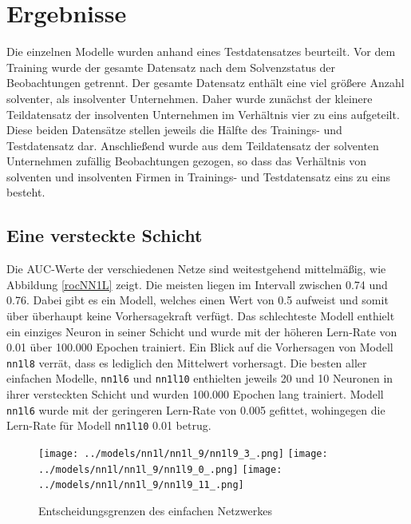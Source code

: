 \documentclass{article}
\begin{document}
\section{Ergebnisse}

Die einzelnen Modelle wurden anhand eines Testdatensatzes beurteilt. Vor dem Training wurde der gesamte Datensatz nach dem Solvenzstatus der Beobachtungen getrennt. Der gesamte Datensatz enth{\"a}lt eine viel gr{\"o}{\ss}ere Anzahl solventer, als insolventer Unternehmen. Daher wurde zun{\"a}chst der kleinere Teildatensatz der insolventen Unternehmen im Verh{\"a}ltnis vier zu eins aufgeteilt. Diese beiden Datens{\"a}tze stellen jeweils die H{\"a}lfte des Trainings- und Testdatensatz dar. Anschlie{\ss}end wurde aus dem Teildatensatz der solventen Unternehmen zuf{\"a}llig Beobachtungen gezogen, so dass das Verh{\"a}ltnis von solventen und insolventen Firmen in Trainings- und Testdatensatz eins zu eins besteht.

\subsection{Eine versteckte Schicht}

Die AUC-Werte der verschiedenen Netze sind weitestgehend mittelm{\"a}{\ss}ig, wie Abbildung \ref{rocNN1L} zeigt. Die meisten liegen im Intervall zwischen 0.74 und 0.76. Dabei gibt es ein Modell, welches einen Wert von 0.5 aufweist und somit {\"u}ber {\"u}berhaupt keine Vorhersagekraft verf{\"u}gt. Das schlechteste Modell enthielt ein einziges Neuron in seiner Schicht und wurde mit der h{\"o}heren Lern-Rate von 0.01 {\"u}ber 100.000 Epochen trainiert. Ein Blick auf die Vorhersagen von Modell \texttt{nn1l8} verr{\"a}t, dass es lediglich den Mittelwert vorhersagt. Die besten aller einfachen Modelle, \texttt{nn1l6} und \texttt{nn1l10} enthielten jeweils 20 und 10 Neuronen in ihrer versteckten Schicht und wurden 100.000 Epochen lang trainiert. Modell \texttt{nn1l6} wurde mit der geringeren Lern-Rate von 0.005 gefittet, wohingegen die Lern-Rate f{\"u}r Modell \texttt{nn1l10} 0.01 betrug.

\begin{center}
\begin{figure}[h]
\caption{Entscheidungsgrenzen des einfachen Netzwerkes}
\label{NN1Linside}
\texttt{[image: ../models/nn1l/nn1l\_9/nn1l9\_3\_.png]}
\texttt{[image: ../models/nn1l/nn1l\_9/nn1l9\_0\_.png]}
\texttt{[image: ../models/nn1l/nn1l\_9/nn1l9\_11\_.png]}
\end{figure}
\end{center}
\end{document}
